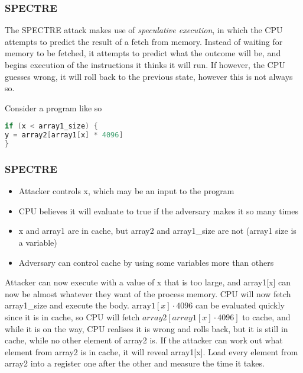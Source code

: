 \begin{frame}[fragile]
    \frametitle{SPECTRE}
    The SPECTRE attack makes use of \textit{speculative execution}, in which the CPU attempts to predict the result of a fetch from memory. Instead of waiting for memory to be fetched, it attempts to predict what the outcome will be, and begins execution of the instructions it thinks it will run. If however, the CPU guesses wrong, it will roll back to the previous state, however this is not always so. 

    Consider a program like so
    \begin{lstlisting}[language=C, frame=single]
if (x < array1_size) {
y = array2[array1[x] * 4096]
}
    \end{lstlisting}
\end{frame}

\begin{frame}
    \frametitle{SPECTRE}
        \begin{itemize}
           \item Attacker controls x, which may be an input to the program 
           \item CPU believes it will evaluate to true if the adversary makes it so many times
           \item x and array1 are in cache, but array2 and array1\_size are not (array1 size is a variable)
           \item Adversary can control cache by using some variables more than others
        \end{itemize}
        Attacker can now execute with a value of x that is too large, and array1[x] can now be almost whatever they want of the process memory. CPU will now fetch array1\_size and execute the body. $\text{array1}[x] \cdot 4096$ can be evaluated quickly since it is in cache, so CPU will fetch $array2[array1[x] \cdot 4096]$ to cache, and while it is on the way, CPU realises it is wrong and rolls back, but it is still in cache, while no other element of array2 is. If the attacker can work out what element from array2 is in cache, it will reveal array1[x]. Load every element from array2 into a register one after the other and measure the time it takes. 
\end{frame}
 
        


